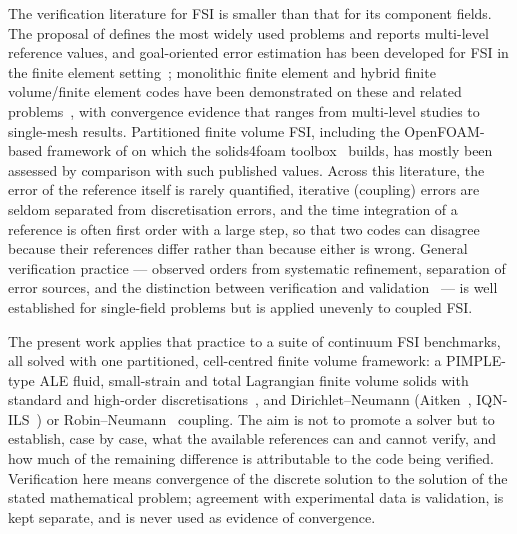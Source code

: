 The verification literature for FSI is smaller than that for its component fields.
The proposal of \citet{Turek2006} defines the most widely used problems and reports multi-level reference values, and goal-oriented error estimation has been developed for FSI in the finite element setting~\citep{Richter2012, Richter2017}; monolithic finite element and hybrid finite volume/finite element codes have been demonstrated on these and related problems~\citep{Heil2004, Heil2008, Eken2016, Lozovskiy2019}, with convergence evidence that ranges from multi-level studies to single-mesh results.
Partitioned finite volume FSI, including the OpenFOAM-based framework of \citet{Tukovic2018} on which the solids4foam toolbox~\citep{Cardiff2025} builds, has mostly been assessed by comparison with such published values.
Across this literature, the error of the reference itself is rarely quantified, iterative (coupling) errors are seldom separated from discretisation errors, and the time integration of a reference is often first order with a large step, so that two codes can disagree because their references differ rather than because either is wrong.
General verification practice --- observed orders from systematic refinement, separation of error sources, and the distinction between verification and validation~\citep{Roache1998, Oberkampf2010} --- is well established for single-field problems but is applied unevenly to coupled FSI.

The present work applies that practice to a suite of continuum FSI benchmarks, all solved with one partitioned, cell-centred finite volume framework: a PIMPLE-type ALE fluid, small-strain and total Lagrangian finite volume solids with standard and high-order discretisations~\citep{Cardiff2026, Batistic2026}, and Dirichlet--Neumann (Aitken~\citep{kuttler2008fixed}, IQN-ILS~\citep{Degroote2009}) or Robin--Neumann~\citep{Tukovic2018b} coupling.
The aim is not to promote a solver but to establish, case by case, what the available references can and cannot verify, and how much of the remaining difference is attributable to the code being verified.
Verification here means convergence of the discrete solution to the solution of the stated mathematical problem; agreement with experimental data is validation, is kept separate, and is never used as evidence of convergence.

